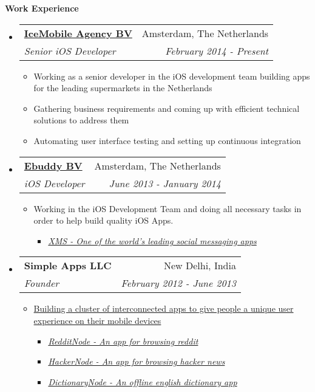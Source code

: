 \documentclass[letterpaper,11pt]{article}
\makeatletter
\newcommand{\resitem}[1]{\item #1 \vspace{-2pt}}
\newcommand{\resheading}[1]{{\large \colorbox{mygrey}{\begin{minipage}{\textwidth}{\textbf{#1 \vphantom{p\^{E}}}}\end{minipage}}}}
\newcommand{\ressubheading}[4]{
\begin{tabular*}{7.0in}{l@{\extracolsep{\fill}}r}
		\textbf{#1} & #2 \\
		\textit{#3} & \textit{#4} \\
\end{tabular*}\vspace{-6pt}}
\makeatother
\begin{document}
\vspace{0.3in}

\resheading{Work Experience}
\begin{itemize}

\item
    \ressubheading{\href{http://www.icemobile.com}{IceMobile Agency BV}}{Amsterdam, The Netherlands}{Senior iOS Developer}{February 2014 - Present}
    \begin{itemize}
        \resitem{Working as a senior developer in the iOS development team building apps for the leading supermarkets in the Netherlands}
        \resitem{Gathering business requirements and coming up with efficient technical solutions to address them}
        \resitem{Automating user interface testing and setting up continuous integration}
    \end{itemize}

\item
    \ressubheading{\href{http://www.ebuddy.com}{Ebuddy BV}}{Amsterdam, The Netherlands}{iOS Developer}{June 2013 - January 2014}
    \begin{itemize}
        \resitem{Working in the iOS Development Team and doing all necessary tasks in order to help build quality iOS Apps.}
	\begin{itemize}
             \resitem{\href{https://itunes.apple.com/ca/app/xms-unlimited-messaging.-better./id425154540?mt=8}{\emph{XMS - One of the world's leading social messaging apps}}}
        \end{itemize}
    \end{itemize}

\item
    \ressubheading{Simple Apps LLC}{New Delhi, India}{Founder}{February 2012 - June 2013}
    \begin{itemize}
        \resitem{\href{http://www.nodemesh.net}{Building a cluster of interconnected apps to give people a unique user experience on their mobile devices}}
        \begin{itemize}
           \resitem{\href{https://itunes.apple.com/ca/app/redditnode/id555533903?mt=8}{\emph{RedditNode - An app for browsing reddit}}}
            \resitem{\href{https://itunes.apple.com/ca/app/hackernode/id473882597?mt=8}{\emph{HackerNode - An app for browsing hacker news}}}
            \resitem{\href{https://itunes.apple.com/ca/app/dictionarynode/id538492050?mt=8}{\emph{DictionaryNode - An offline english dictionary app}}}
        \end{itemize}
    \end{itemize}


\end{itemize}
\end{document}
